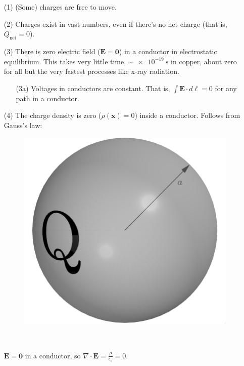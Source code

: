 \documentclass{article}
\begin{document}
\begin{enumerate}

\item[(1)] (Some) charges are free to move.

\item[(2)] Charges exist in vast numbers, even if there's no net charge (that is, $Q_{\text{net}} = 0$).

\item[(3)] There is zero electric field ($\bm{E} = \bm{0}$) in a conductor in electrostatic equilibrium. This takes very little time, $\sim \SI{e-19}{\second}$ in copper, about zero for all but the very fastest processes like x-ray radiation.

\begin{enumerate}

\item[(3a)] Voltages in conductors are constant. That is, $\displaystyle \int \bm{E} \cdot d\bm{\ell} = 0$ for any path in a conductor.

\end{enumerate}

\item[(4)] The charge density is zero ($\rho(\bm{x}) = 0$) inside a conductor. Follows from Gauss's law:

\begin{minipage}{0.3\textwidth}
\begin{figure}[H]
\centering
    \includegraphics[width=\textwidth]{figures/6l2.png}
\end{figure}
\end{minipage}
~
\begin{minipage}{0.6\textwidth}
\begin{center}
$\displaystyle \bm{E} = \bm{0}$ in a conductor, so $\displaystyle \nabla \cdot \bm{E} = \frac{\rho}{\epsilon_o} = 0$.
\end{center}
\end{minipage}


\end{enumerate}
\end{document}
